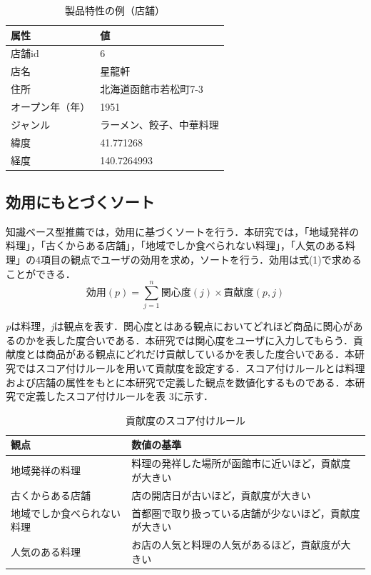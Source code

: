 \documentclass{funthesis}
\begin{document}
\begin{table}
  \begin{center}
  \scriptsize
    \caption{製品特性の例（店舗）}
   \begin{tabular}{p{3.6cm}|p{3.6cm}} 
    \hline
属性 & 値 \\ \hline\hline
      店舗id & 6\\ \hline
      店名 & 星龍軒 \\ \hline
      住所 &  北海道函館市若松町7-3\\ \hline
      オープン年（年）& 1951 \\ \hline
      ジャンル & ラーメン、餃子、中華料理 \\ \hline
      緯度 & 41.771268 \\ \hline
      経度 & 140.7264993 \\ \hline
  \end{tabular}
  \end{center}
\end{table}

\subsection{効用にもとづくソート}
知識ベース型推薦では，効用に基づくソートを行う．本研究では，「地域発祥の料理」，「古くからある店舗」，「地域でしか食べられない料理」，「人気のある料理」の4項目の観点でユーザの効用を求め，ソートを行う．効用は式(1)で求めることができる．
\begin{equation}
効用(p)=\sum_{j=1}^{n} 関心度(j)×貢献度(p,j) 
\end{equation}

{\it p}は料理，{\it j}は観点を表す．関心度とはある観点においてどれほど商品に関心があるのかを表した度合いである．本研究では関心度をユーザに入力してもらう．貢献度とは商品がある観点にどれだけ貢献しているかを表した度合いである．本研究ではスコア付けルールを用いて貢献度を設定する．スコア付けルールとは料理および店舗の属性をもとに本研究で定義した観点を数値化するものである．本研究で定義したスコア付けルールを表 3に示す．

\begin{table}
  \begin{center}
  \scriptsize
    \caption{貢献度のスコア付けルール}
   \begin{tabular}{p{3.4cm}|p{3.9cm}} 
    \hline
観点 & 数値の基準 \\ \hline\hline
      地域発祥の料理 &  料理の発祥した場所が函館市に近いほど，貢献度が大きい\\ \hline
      古くからある店舗 & 店の開店日が古いほど，貢献度が大きい\\ \hline
      地域でしか食べられない料理 & 首都圏で取り扱っている店舗が少ないほど，貢献度が大きい\\ \hline
      人気のある料理 & お店の人気と料理の人気があるほど，貢献度が大きい \\ \hline
  \end{tabular}
  \end{center}
\end{table}
\end{document}
